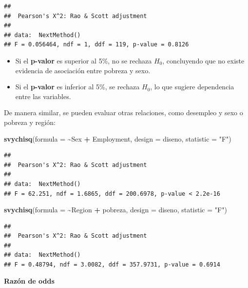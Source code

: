 \documentclass[
  spanish,
  12pt,
]{book}
\newenvironment{Shaded}{\begin{snugshade}}{\end{snugshade}}
\newcommand{\AttributeTok}[1]{\textcolor[rgb]{0.13,0.29,0.53}{#1}}
\newcommand{\FunctionTok}[1]{\textcolor[rgb]{0.13,0.29,0.53}{\textbf{#1}}}
\newcommand{\NormalTok}[1]{#1}
\newcommand{\SpecialCharTok}[1]{\textcolor[rgb]{0.81,0.36,0.00}{\textbf{#1}}}
\newcommand{\StringTok}[1]{\textcolor[rgb]{0.31,0.60,0.02}{#1}}
\providecommand{\tightlist}{%
  \setlength{\itemsep}{0pt}\setlength{\parskip}{0pt}}
\begin{document}
\begin{verbatim}
## 
##  Pearson's X^2: Rao & Scott adjustment
## 
## data:  NextMethod()
## F = 0.056464, ndf = 1, ddf = 119, p-value = 0.8126
\end{verbatim}

\begin{itemize}
\tightlist
\item
  Si el \textbf{p-valor} es superior al 5\%, no se rechaza \(H_0\), concluyendo que no existe evidencia de asociación entre pobreza y sexo.
\item
  Si el \textbf{p-valor} es inferior al 5\%, se rechaza \(H_0\), lo que sugiere dependencia entre las variables.
\end{itemize}

De manera similar, se pueden evaluar otras relaciones, como desempleo y sexo o pobreza y región:

\begin{Shaded}
\begin{Highlighting}[]
\FunctionTok{svychisq}\NormalTok{(}\AttributeTok{formula =} \SpecialCharTok{\textasciitilde{}}\NormalTok{Sex }\SpecialCharTok{+}\NormalTok{ Employment, }\AttributeTok{design =}\NormalTok{ diseno, }\AttributeTok{statistic =} \StringTok{"F"}\NormalTok{)}
\end{Highlighting}
\end{Shaded}

\begin{verbatim}
## 
##  Pearson's X^2: Rao & Scott adjustment
## 
## data:  NextMethod()
## F = 62.251, ndf = 1.6865, ddf = 200.6978, p-value < 2.2e-16
\end{verbatim}

\begin{Shaded}
\begin{Highlighting}[]
\FunctionTok{svychisq}\NormalTok{(}\AttributeTok{formula =} \SpecialCharTok{\textasciitilde{}}\NormalTok{Region }\SpecialCharTok{+}\NormalTok{ pobreza, }\AttributeTok{design =}\NormalTok{ diseno, }\AttributeTok{statistic =} \StringTok{"F"}\NormalTok{)}
\end{Highlighting}
\end{Shaded}

\begin{verbatim}
## 
##  Pearson's X^2: Rao & Scott adjustment
## 
## data:  NextMethod()
## F = 0.48794, ndf = 3.0082, ddf = 357.9731, p-value = 0.6914
\end{verbatim}

\textbf{Razón de odds}
\end{document}
